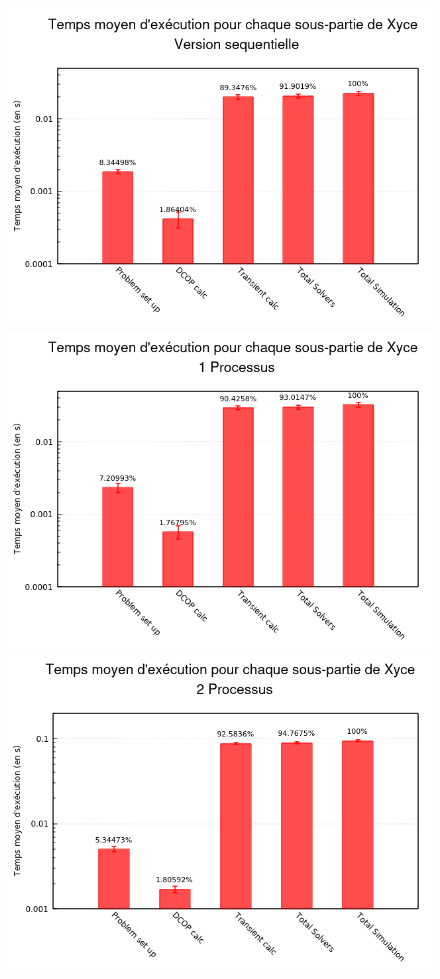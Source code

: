 \documentclass[11pt,a4paper,oneside]{memoir}
\theoremstyle{definition}
\theoremstyle{remark}
\theoremstyle{plain}
\begin{document}
\begin{figure}
\begin{center}
\includegraphics[scale=0.6]{Images-Rapport/Profil_Xyce/Profil_Xyce_sequentiel.png}
\includegraphics[scale=0.45]{Images-Rapport/Profil_Xyce/Profil_Xyce_parallele1.png}
\includegraphics[scale=0.45]{Images-Rapport/Profil_Xyce/Profil_Xyce_parallele2.png}

\end{center}
\end{figure}
\end{document}
